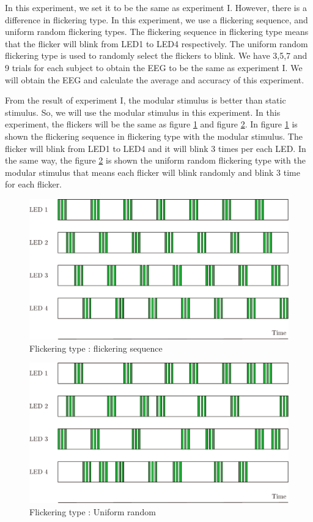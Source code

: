 In this experiment, we set it to be the same as experiment I. However, there is a difference in flickering type. In this experiment, we use a flickering sequence, and uniform random flickering types. The flickering sequence in flickering type means that the flicker will blink from LED1 to LED4 respectively. The uniform random flickering type is used to randomly select the flickers to blink. We have 3,5,7 and 9 trials for each subject to obtain the EEG to be the same as experiment I. We will obtain the EEG and calculate the average and accuracy of this experiment.

From the result of experiment I, the modular stimulus is better than static stimulus. So, we will use the modular stimulus in this experiment. In this experiment, the flickers will be the same as figure \ref{fig:mod_reg} and figure \ref{fig:mod_uni}.
In figure \ref{fig:mod_reg} is shown the flickering sequence in flickering type with the modular stimulus. The flicker will blink from LED1 to LED4 and it will blink 3 times per each LED. In the same way, the figure \ref{fig:mod_uni} is shown the uniform random flickering type with the modular stimulus that means each flicker will blink randomly and blink 3 time for each flicker.

\begin{figure}[ht]
	\centering
	\includegraphics[scale = 0.65]{chapter7/mod_nor.pdf}
	\caption{Flickering type : flickering sequence}
    \label{fig:mod_reg}
\end{figure}

\begin{figure}[ht]
	\centering
	\includegraphics[scale = 0.65]{chapter7/mod_uni.pdf}
	\caption{Flickering type : Uniform random}
    \label{fig:mod_uni}
\end{figure}

